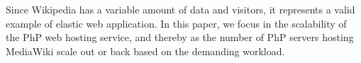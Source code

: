 

Since Wikipedia has a variable amount of data and visitors, it represents a valid example of elastic web application. In this paper, we focus in the scalability of the PhP web hosting service, and thereby as the number of PhP servers hosting MediaWiki scale out or back based on the demanding workload.

